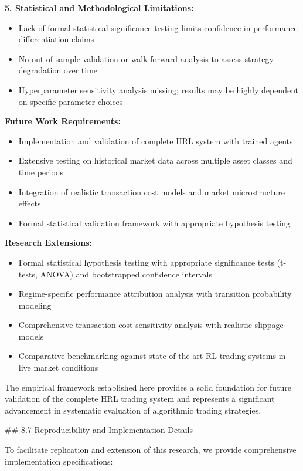 \documentclass[11pt]{article}
\begin{document}
\textbf{5. Statistical and Methodological Limitations:}
\begin{itemize}
\item Lack of formal statistical significance testing limits confidence in performance differentiation claims
\item No out-of-sample validation or walk-forward analysis to assess strategy degradation over time
\item Hyperparameter sensitivity analysis missing; results may be highly dependent on specific parameter choices

\end{itemize}
\textbf{Future Work Requirements:}
\begin{itemize}
\item Implementation and validation of complete HRL system with trained agents
\item Extensive testing on historical market data across multiple asset classes and time periods
\item Integration of realistic transaction cost models and market microstructure effects
\item Formal statistical validation framework with appropriate hypothesis testing

\end{itemize}
\textbf{Research Extensions:}
\begin{itemize}
\item Formal statistical hypothesis testing with appropriate significance tests (t-tests, ANOVA) and bootstrapped confidence intervals
\item Regime-specific performance attribution analysis with transition probability modeling
\item Comprehensive transaction cost sensitivity analysis with realistic slippage models
\item Comparative benchmarking against state-of-the-art RL trading systems in live market conditions

\end{itemize}
The empirical framework established here provides a solid foundation for future validation of the complete HRL trading system and represents a significant advancement in systematic evaluation of algorithmic trading strategies.

\#\# 8.7 Reproducibility and Implementation Details

To facilitate replication and extension of this research, we provide comprehensive implementation specifications:
\end{document}
